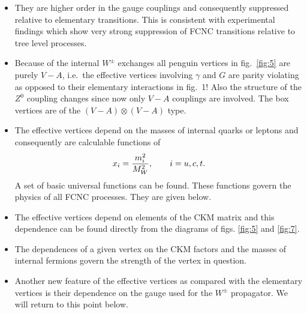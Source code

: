 \documentclass[12pt,rotate]{article}
\begin{document}
\begin{itemize}
\begin{itemize}
\item
They are higher order in the gauge couplings and consequently
suppressed relative to elementary transitions. This is consistent
with experimental findings which show very strong suppression
of FCNC transitions relative to tree level processes.
\item
Because of the internal $W^{\pm}$ exchanges all penguin
vertices in fig.\ \ref{fig:5} are purely $V-A$, 
i.e.\ the effective vertices
involving $\gamma$ and $G$ are parity violating as opposed to their
elementary interactions in fig.\ 1! Also the structure of the $Z^0$ coupling
changes since now only $V-A$ couplings are involved. The box vertices
are of the $(V-A)\otimes(V-A)$ type.
\item
The effective vertices depend on the masses of internal
quarks or leptons and consequently are calculable functions of
\begin{equation}
x_i = {{m_i^2}\over{M_W^2}},\qquad i=u,c,t.
\end{equation}
A set of basic universal functions can be found. These functions
govern the physics of all FCNC processes. They are given below.
\item
The effective vertices depend on elements of the CKM
matrix and this dependence can be found directly from the diagrams of
figs. \ref{fig:5} and \ref{fig:7}.
\item
The dependences of a given  vertex on 
 the CKM factors and the masses of internal fermions 
govern  the strength of the vertex in question.
\item
Another new feature of the effective vertices 
 as compared with the elementary vertices is their dependence on
the gauge used for the $W^{\pm}$ propagator. We will return to this
point below.
\end{itemize}


\end{itemize}
\end{document}
